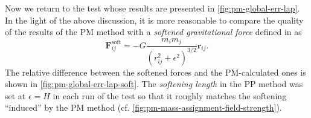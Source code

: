 Now we return to the test whose results are presented in \autoref{fig:pm-global-err-lap}.
In the light of the above discussion, it is more reasonable to compare the quality of the results of the PM method with a \textit{softened gravitational force} defined in \cite{Zhang_2019} as
\begin{equation}\label{eq:softened-force}
    \mathbf{F}^\textrm{soft}_{ij} = -G\frac{m_i m_j}{(r_{ij}^2 + \epsilon^2)^{3/2}}\mathbf{r}_{ij}.
\end{equation}
The relative difference between the softened forces and the PM-calculated ones is shown in \autoref{fig:pm-global-err-lap-soft}.
The \textit{softening length} in the PP method was set at $\epsilon = H$ in each run of the test so that it roughly matches the softening ``induced'' by the PM method (cf. \autoref{fig:pm-mass-assignment-field-strength}).
